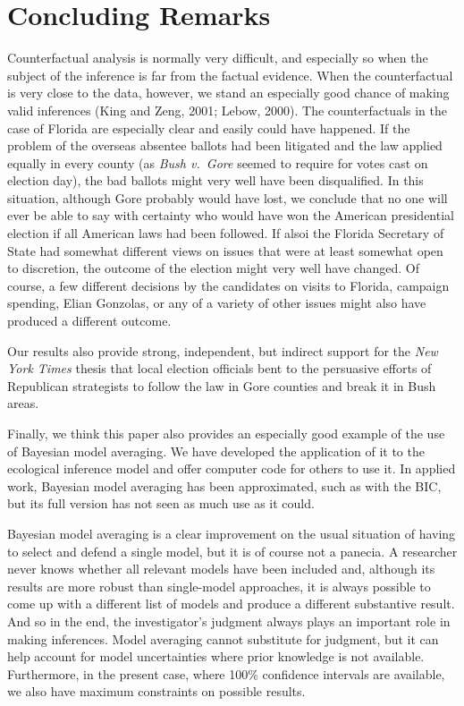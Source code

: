 \documentclass[11pt,titlepage]{article}
\begin{document}
\section{Concluding Remarks}\label{s:concl}

Counterfactual analysis is normally very difficult, and especially so
when the subject of the inference is far from the factual evidence.
When the counterfactual is very close to the data, however, we stand
an especially good chance of making valid inferences (King and Zeng,
2001; Lebow, 2000)\nocite{KinZen01,Lebow00}.  The counterfactuals in
the case of Florida are especially clear and easily could have
happened.  If the problem of the overseas absentee ballots had been
litigated and the law applied equally in every county (as \emph{Bush
  v.\ Gore} seemed to require for votes cast on election day), the bad
ballots might very well have been disqualified.  In this situation,
although Gore probably would have lost, we conclude that no one will
ever be able to say with certainty who would have won the American
presidential election if all American laws had been followed.  If
alsoi the Florida Secretary of State had somewhat different views on
issues that were at least somewhat open to discretion, the outcome of
the election might very well have changed.  Of course, a few different
decisions by the candidates on visits to Florida, campaign spending,
Elian Gonzolas, or any of a variety of other issues might also have
produced a different outcome.

Our results also provide strong, independent, but indirect support for
the \emph{New York Times} thesis that local election officials bent to
the persuasive efforts of Republican strategists to follow the law in
Gore counties and break it in Bush areas.

Finally, we think this paper also provides an especially good example
of the use of Bayesian model averaging.  We have developed the
application of it to the ecological inference model and offer computer
code for others to use it.  In applied work, Bayesian model averaging
has been approximated, such as with the BIC, but its full version has
not seen as much use as it could.

Bayesian model averaging is a clear improvement on the usual situation
of having to select and defend a single model, but it is of course not
a panecia. A researcher never knows whether all relevant models have
been included and, although its results are more robust than
single-model approaches, it is always possible to come up with a
different list of models and produce a different substantive result.
And so in the end, the investigator's judgment always plays an
important role in making inferences.  Model averaging cannot
substitute for judgment, but it can help account for model
uncertainties where prior knowledge is not available. Furthermore, in
the present case, where 100\% confidence intervals are available, we
also have maximum constraints on possible results.
\end{document}
